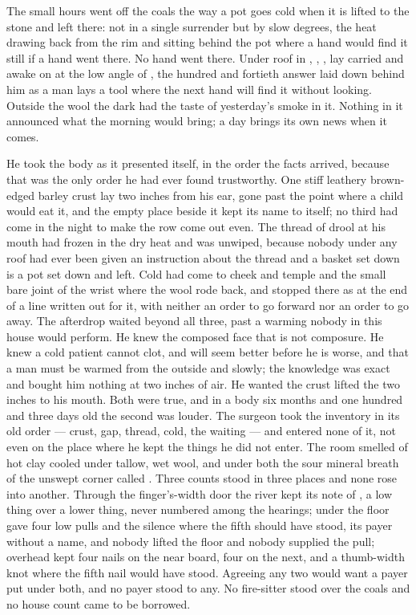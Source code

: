 
The small hours went off the coals the way a pot goes cold when it is lifted to the stone and left there: not in a single surrender but by slow degrees, the heat drawing back from the rim and sitting behind the pot where a hand would find it still if a hand went there. No hand went there. Under  roof in , , ,  lay carried and awake on  at the low angle of , the hundred and fortieth answer laid down behind him as a man lays a tool where the next hand will find it without looking. Outside the wool the dark had the taste of yesterday's smoke in it. Nothing in it announced what the morning would bring; a day brings its own news when it comes.

He took the body as it presented itself, in the order the facts arrived, because that was the only order he had ever found trustworthy. One stiff leathery brown-edged barley crust lay two inches from his ear, gone past the point where a child would eat it, and the empty place beside it kept its name to itself; no third had come in the night to make the row come out even. The thread of drool at his mouth had frozen in the dry heat and was unwiped, because nobody under any roof had ever been given an instruction about the thread and a basket set down is a pot set down and left. Cold had come to cheek and temple and the small bare joint of the wrist where the wool rode back, and stopped there as at the end of a line written out for it, with neither an order to go forward nor an order to go away. The afterdrop waited beyond all three, past a warming nobody in this house would perform. He knew the composed face that is not composure. He knew a cold patient cannot clot, and will seem better before he is worse, and that a man must be warmed from the outside and slowly; the knowledge was exact and bought him nothing at two inches of air. He wanted the crust lifted the two inches to his mouth. Both were true, and in a body six months and one hundred and three days old the second was louder. The surgeon took the inventory in its old order --- crust, gap, thread, cold, the waiting --- and entered none of it, not even on the place where he kept the things he did not enter. The room smelled of hot clay cooled under tallow, wet wool, and under both the sour mineral breath of the unswept corner called . Three counts stood in three places and none rose into another. Through the finger's-width door the river kept its note of , a low thing over a lower thing, never numbered among the hearings; under the floor  gave four low pulls and the silence where the fifth should have stood, its payer without a name, and nobody lifted the floor and nobody supplied the pull; overhead  kept four nails on the near board, four on the next, and a thumb-width knot where the fifth nail would have stood. Agreeing any two would want a payer put under both, and no payer stood to any. No fire-sitter stood over the coals and no house count came to be borrowed.

